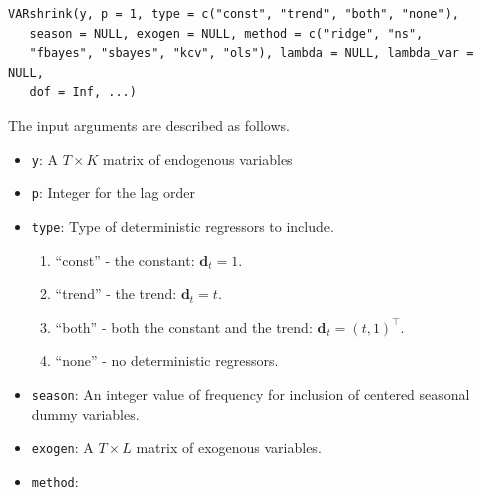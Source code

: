 \begin{verbatim}
VARshrink(y, p = 1, type = c("const", "trend", "both", "none"),
   season = NULL, exogen = NULL, method = c("ridge", "ns",
   "fbayes", "sbayes", "kcv", "ols"), lambda = NULL, lambda_var = NULL,
   dof = Inf, ...)
\end{verbatim}

The input arguments are described as follows.

\begin{itemize}
\item
  \texttt{y}: A \(T \times K\) matrix of endogenous variables
\item
  \texttt{p}: Integer for the lag order
\item
  \texttt{type}: Type of deterministic regressors to include.

  \begin{enumerate}
  \def\labelenumi{\arabic{enumi}.}
  \tightlist
  \item
    ``const'' - the constant: \(\mathbf{d}_t = 1\).
  \item
    ``trend'' - the trend: \(\mathbf{d}_t = t\).
  \item
    ``both'' - both the constant and the trend:
    \(\mathbf{d}_t = (t, 1)^\top\).
  \item
    ``none'' - no deterministic regressors.
  \end{enumerate}
\item
  \texttt{season}: An integer value of frequency for inclusion of centered
  seasonal dummy variables.
\item
  \texttt{exogen}: A \(T \times L\) matrix of exogenous variables.
\item
  \texttt{method}:


\end{itemize}

